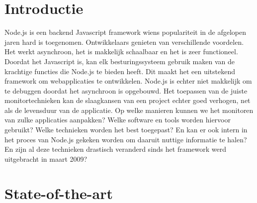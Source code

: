 
\section{Introductie} %
\label{sec:introductie}

Node.js is een backend Javascript framework wiens populariteit in de afgelopen jaren hard is toegenomen. Ontwikkelaars genieten van verschillende voordelen. Het werkt asynchroon, het is makkelijk schaalbaar en het is zeer functioneel. Doordat het Javascript is, kan elk besturingssysteem gebruik maken van de krachtige functies die Node.js te bieden heeft. Dit maakt het een uitstekend framework om webapplicaties te ontwikkelen. Node.js is echter niet makkelijk om te debuggen doordat het asynchroon is opgebouwd. Het toepassen van de juiste monitortechnieken kan de slaagkansen van een project echter goed verhogen, net als de levensduur van de applicatie. Op welke manieren kunnen we het monitoren van zulke applicaties aanpakken? Welke software en tools worden hiervoor gebruikt? Welke technieken worden het best toegepast? En kan er ook intern in het proces van Node.js gekeken worden om daaruit nuttige informatie te halen? En zijn al deze technieken drastisch veranderd sinds het framework werd uitgebracht in maart 2009? 


\section{State-of-the-art}
\label{sec:state-of-the-art}

